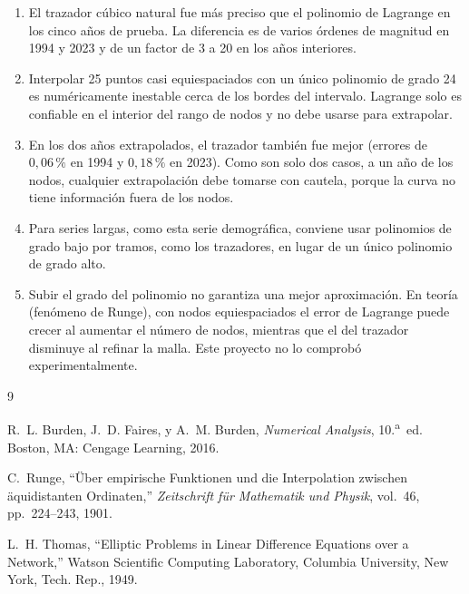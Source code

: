 \documentclass[11pt]{article}
\begin{document}
\begin{enumerate}
    \item El trazador cúbico natural fue más preciso que el polinomio de Lagrange
    en los cinco años de prueba. La diferencia es de varios órdenes de magnitud en
    1994 y 2023 y de un factor de 3 a 20 en los años interiores.
    \item Interpolar 25 puntos casi equiespaciados con un único polinomio de grado
    24 es numéricamente inestable cerca de los bordes del intervalo. Lagrange solo
    es confiable en el interior del rango de nodos y no debe usarse para extrapolar.
    \item En los dos años extrapolados, el trazador también fue mejor (errores de
    $0{,}06\,\%$ en 1994 y $0{,}18\,\%$ en 2023). Como son solo dos casos, a un año
    de los nodos, cualquier extrapolación debe tomarse con cautela, porque la
    curva no tiene información fuera de los nodos.
    \item Para series largas, como esta serie demográfica, conviene usar
    polinomios de grado bajo por tramos, como los trazadores, en lugar de un único
    polinomio de grado alto.
    \item Subir el grado del polinomio no garantiza una mejor aproximación. En teoría
    (fenómeno de Runge), con nodos equiespaciados el error de Lagrange puede crecer
    al aumentar el número de nodos, mientras que el del trazador disminuye al
    refinar la malla. Este proyecto no lo comprobó experimentalmente.
\end{enumerate}


\begin{thebibliography}{9}

R.~L. Burden, J.~D. Faires, y A.~M. Burden, 
\emph{Numerical Analysis}, 10.\textsuperscript{a}~ed. Boston, MA: Cengage Learning, 2016.

C.~Runge, 
``Über empirische Funktionen und die Interpolation zwischen äquidistanten Ordinaten,'' 
\emph{Zeitschrift für Mathematik und Physik}, vol.~46, pp.~224--243, 1901.

L.~H. Thomas, 
``Elliptic Problems in Linear Difference Equations over a Network,'' 
Watson Scientific Computing Laboratory, Columbia University, New York, Tech. Rep., 1949.

\end{thebibliography}
\end{document}
